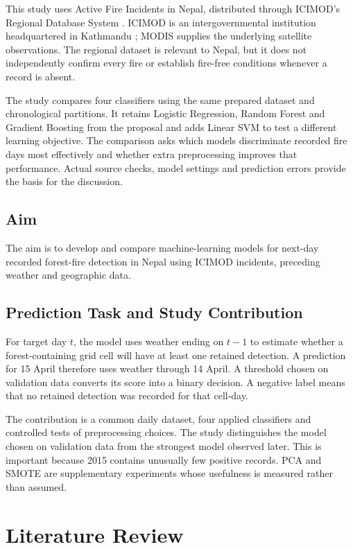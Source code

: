 \documentclass[conference,a4paper]{IEEEtran}
\begin{document}
This study uses Active Fire Incidents in Nepal, distributed through ICIMOD's Regional Database System \citep{icimodfire}. ICIMOD is an intergovernmental institution headquartered in Kathmandu \citep{icimodabout}; MODIS supplies the underlying satellite observations. The regional dataset is relevant to Nepal, but it does not independently confirm every fire or establish fire-free conditions whenever a record is absent.

The study compares four classifiers using the same prepared dataset and chronological partitions. It retains Logistic Regression, Random Forest and Gradient Boosting from the proposal and adds Linear SVM to test a different learning objective. The comparison asks which models discriminate recorded fire days most effectively and whether extra preprocessing improves that performance. Actual source checks, model settings and prediction errors provide the basis for the discussion.

\subsection{Aim}
The aim is to develop and compare machine-learning models for next-day recorded forest-fire detection in Nepal using ICIMOD incidents, preceding weather and geographic data.

\subsection{Prediction Task and Study Contribution}
For target day $t$, the model uses weather ending on $t-1$ to estimate whether a forest-containing grid cell will have at least one retained detection. A prediction for 15 April therefore uses weather through 14 April. A threshold chosen on validation data converts its score into a binary decision. A negative label means that no retained detection was recorded for that cell-day.

The contribution is a common daily dataset, four applied classifiers and controlled tests of preprocessing choices. The study distinguishes the model chosen on validation data from the strongest model observed later. This is important because 2015 contains unusually few positive records. PCA and SMOTE are supplementary experiments whose usefulness is measured rather than assumed.

\section{Literature Review}
\end{document}
